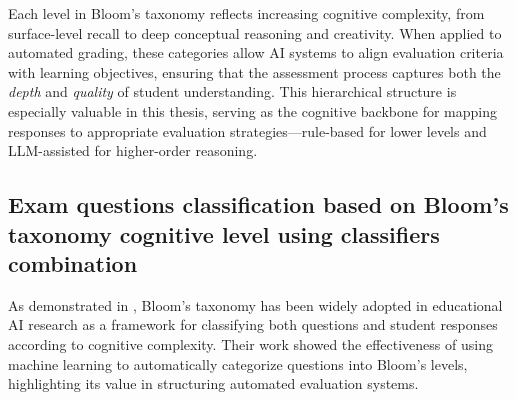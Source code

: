 Each level in Bloom’s taxonomy reflects increasing cognitive complexity, from surface-level recall to deep conceptual reasoning and creativity. 
When applied to automated grading, these categories allow AI systems to align evaluation criteria with learning objectives, ensuring that 
the assessment process captures both the \emph{depth} and \emph{quality} of student understanding. 
This hierarchical structure is especially valuable in this thesis, serving as the cognitive backbone for mapping responses to appropriate evaluation strategies—rule-based for lower levels and LLM-assisted for higher-order reasoning.


\subsection{Exam questions classification based on Bloom’s taxonomy cognitive level using classifiers combination}

As demonstrated in \cite{Abduljabbar2015}, Bloom’s taxonomy 
has been widely adopted in educational AI research as a 
framework for classifying both questions and student 
responses according to cognitive complexity. Their work 
showed the effectiveness of using machine learning to 
automatically categorize questions into Bloom’s levels, 
highlighting its value in structuring automated evaluation 
systems.

